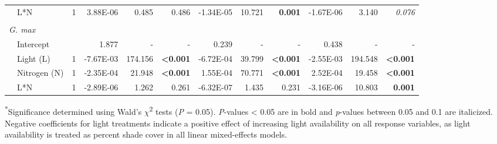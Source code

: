 \begin{landscape}
\begin{table}
{\begin{tabular}{p{0.1cm}p{2.5cm}p{0.5cm}p{1.75cm}p{1.5cm}p{1.5cm}p{1.75cm}p{1.5cm}p{1.5cm}p{1.75cm}p{1.5cm}p{1.5cm}}
         & L*N
         & \multicolumn{1}{r}{1}            
         & \multicolumn{1}{r}{3.88E-06}     & \multicolumn{1}{r}{0.485}     & \multicolumn{1}{r}{0.486}
         & \multicolumn{1}{r}{-1.34E-05}    & \multicolumn{1}{r}{10.721}    & \multicolumn{1}{r}{\textbf{0.001}}
         & \multicolumn{1}{r}{-1.67E-06}    & \multicolumn{1}{r}{3.140}     & \multicolumn{1}{r}{\textit{0.076}}                 
         \\ 
         &&&&&&&&&& 
         \\ 
         
         \multicolumn{2}{l}{\textit{G. max}} &&&&&&&&&& 
         \\
         & Intercept
         && \multicolumn{1}{r}{1.877}       & \multicolumn{1}{r}{-}         & \multicolumn{1}{r}{-}                     
         & \multicolumn{1}{r}{0.239}        & \multicolumn{1}{r}{-}         & \multicolumn{1}{r}{-}  
         & \multicolumn{1}{r}{0.438}        & \multicolumn{1}{r}{-}         & \multicolumn{1}{r}{-} 
         \\
         
         & Light (L)
         & \multicolumn{1}{r}{1}
         & \multicolumn{1}{r}{-7.67E-03}    & \multicolumn{1}{r}{174.156}   & \multicolumn{1}{r}{\textbf{<0.001}}      
         & \multicolumn{1}{r}{-6.72E-04}    & \multicolumn{1}{r}{39.799}    & \multicolumn{1}{r}{\textbf{<0.001}}
         & \multicolumn{1}{r}{-2.55E-03}    & \multicolumn{1}{r}{194.548}   & \multicolumn{1}{r}{\textbf{<0.001}} 
         \\
         
         & Nitrogen (N)
         & \multicolumn{1}{r}{1} 
         & \multicolumn{1}{r}{-2.35E-04}    & \multicolumn{1}{r}{21.948}    & \multicolumn{1}{r}{\textbf{<0.001}}
         & \multicolumn{1}{r}{1.55E-04}     & \multicolumn{1}{r}{70.771}    & \multicolumn{1}{r}{\textbf{<0.001}}
         & \multicolumn{1}{r}{2.52E-04}     & \multicolumn{1}{r}{19.458}    & \multicolumn{1}{r}{\textbf{<0.001}} 
         \\
         
         & L*N
         & \multicolumn{1}{r}{1}
         & \multicolumn{1}{r}{-2.89E-06}    & \multicolumn{1}{r}{1.262}     & \multicolumn{1}{r}{0.261}                
         & \multicolumn{1}{r}{-6.32E-07}    & \multicolumn{1}{r}{ 1.435}    & \multicolumn{1}{r}{0.231}                
         & \multicolumn{1}{r}{-3.16E-06}    & \multicolumn{1}{r}{10.803}    & \multicolumn{1}{r}{\textbf{0.001}} 
         \\ 
         \hline 
\end{tabular}}
\label{tab:table2.1}
\end{table}
\noindent \textsuperscript{*}Significance determined using Wald’s $\chi$\textsuperscript{2} tests (\textit{P} = 0.05). \textit{P}-values < 0.05 are in bold and \textit{p}-values between 0.05 and 0.1 are italicized. Negative coefficients for light treatments indicate a positive effect of increasing light availability on all response variables, as light availability is treated as percent shade cover in all linear mixed-effects models.
\end{landscape}
